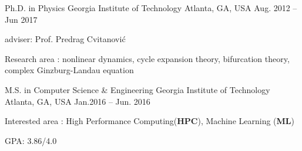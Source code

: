 


\begin{cventries}

\cventry
{Ph.D. in Physics}
{Georgia Institute of Technology}
{Atlanta, GA, USA}
{Aug. 2012 -- Jun 2017}
{
  \begin{cvitems}
    \item adviser: Prof. Predrag Cvitanovi\'c
    \item Research area : nonlinear dynamics, cycle expansion theory, bifurcation theory,
      complex Ginzburg-Landau equation
  \end{cvitems}
}


\cventry
{M.S. in Computer Science \& Engineering }
{Georgia Institute of Technology}
{Atlanta, GA, USA}
{Jan.2016 -- Jun. 2016}
{
  \begin{cvitems}
    \item Interested area : High Performance Computing(\textbf{HPC}), 
      Machine Learning (\textbf{ML})
    \item GPA: 3.86/4.0
  \end{cvitems}
}





\end{cventries}
